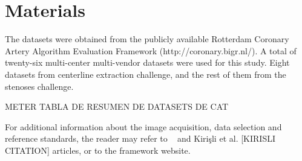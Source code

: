 \section{Materials}
 
The datasets were obtained from the publicly available Rotterdam Coronary Artery Algorithm Evaluation Framework (http://coronary.bigr.nl/). A total of twenty-six multi-center multi-vendor datasets were used for this study. Eight datasets from centerline extraction challenge, and the rest of them from the stenoses challenge. 

METER TABLA DE RESUMEN DE DATASETS DE CAT

For additional information about the image acquisition, data selection and reference standards, the reader may refer to ~\citep{Metz2008} and Kirişli et al. [KIRISLI CITATION] articles, or to the framework website.



